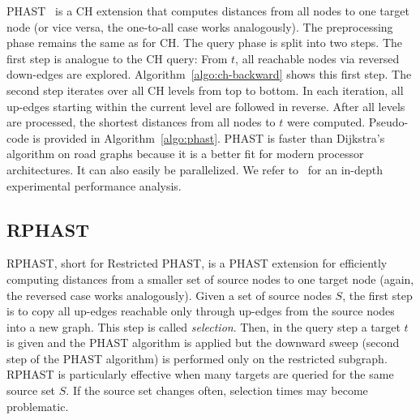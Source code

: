 \documentclass[a4paper,UKenglish,cleveref, autoref, thm-restate]{lipics-v2021}
\begin{document}
PHAST~\cite{dgnw-phast-13} is a CH extension that computes distances from all nodes to one target node (or vice versa, the one-to-all case works analogously).
The preprocessing phase remains the same as for CH.
The query phase is split into two steps.
The first step is analogue to the CH query:
From $t$, all reachable nodes via reversed down-edges are explored.
Algorithm~\ref{algo:ch-backward} shows this first step.
The second step iterates over all CH levels from top to bottom.
In each iteration, all up-edges starting within the current level are followed in reverse.
After all levels are processed, the shortest distances from all nodes to $t$ were computed.
Pseudo-code is provided in Algorithm~\ref{algo:phast}.
PHAST is faster than Dijkstra's algorithm on road graphs because it is a better fit for modern processor architectures.
It can also easily be parallelized.
We refer to~\cite{dgnw-phast-13} for an in-depth experimental performance analysis.


\subsection{RPHAST}

RPHAST, short for Restricted PHAST, is a PHAST extension for efficiently computing distances from a smaller set of source nodes to one target node (again, the reversed case works analogously).
Given a set of source nodes $S$, the first step is to copy all up-edges reachable only through up-edges from the source nodes into a new graph.
This step is called \emph{selection}.
Then, in the query step a target $t$ is given and the PHAST algorithm is applied but the downward sweep (second step of the PHAST algorithm) is performed only on the restricted subgraph.
RPHAST is particularly effective when many targets are queried for the same source set $S$.
If the source set changes often, selection times may become problematic.
\end{document}
